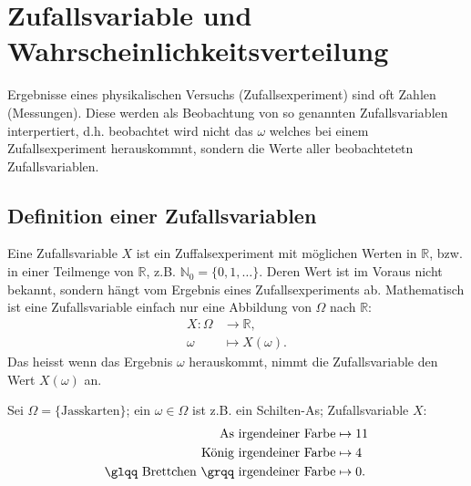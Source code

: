 \chapter{Zufallsvariable und Wahrscheinlichkeitsverteilung}
\label{kap2}
Ergebnisse eines physikalischen Versuchs (Zufallsexperiment) sind oft Zahlen (Messungen). Diese werden als Beobachtung von so genannten Zufallsvariablen interpertiert, d.h. beobachtet wird nicht das $\omega$ welches bei einem Zufallsexperiment herauskommnt, sondern die Werte aller beobachtetetn Zufallsvariablen.
\section{Definition einer Zufallsvariablen}
Eine Zufallsvariable $X$ ist ein Zuffalsexperiment mit möglichen Werten in $\mathbb{R}$, bzw. in einer Teilmenge von $\mathbb{R}$, z.B. $\mathbb{N}_0=\{0,1,\ldots\}$. Deren Wert ist im Voraus nicht bekannt, sondern hängt vom Ergebnis eines Zufallsexperiments ab. Mathematisch ist eine Zufallsvariable einfach nur eine Abbildung von $\Omega$ nach $\mathbb{R}$:
\begin{align*}
	X:\Omega&\to \mathbb{R},\\
	\omega &\mapsto X(\omega).
\end{align*}
Das heisst wenn das Ergebnis $\omega$ herauskommt, nimmt die Zufallsvariable den Wert $X(\omega)$ an.
\begin{bspl}
	Sei $\Omega=\{\text{Jasskarten}\}$; ein $\omega\in\Omega$ ist z.B. ein Schilten-As; Zufallsvariable $X$:
	\begin{align*}
		\text{As irgendeiner Farbe}&\mapsto 11\\
		\text{König irgendeiner Farbe}&\mapsto 4\\
		\text{\glqq Brettchen \grqq irgendeiner Farbe}&\mapsto 0.
	\end{align*}
\end{bspl}
